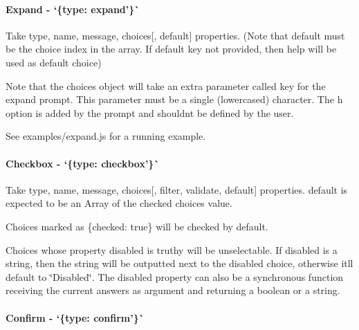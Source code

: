  



\paragraph*{Expand -\/ `\{type\+: \textquotesingle{}expand'\}\`{}}

Take {\ttfamily type}, {\ttfamily name}, {\ttfamily message}, {\ttfamily choices}\mbox{[}, {\ttfamily default}\mbox{]} properties. (Note that default must be the choice {\ttfamily index} in the array. If {\ttfamily default} key not provided, then {\ttfamily help} will be used as default choice)

Note that the {\ttfamily choices} object will take an extra parameter called {\ttfamily key} for the {\ttfamily expand} prompt. This parameter must be a single (lowercased) character. The {\ttfamily h} option is added by the prompt and shouldn\textquotesingle{}t be defined by the user.

See {\ttfamily examples/expand.\+js} for a running example.

  



\paragraph*{Checkbox -\/ `\{type\+: \textquotesingle{}checkbox'\}\`{}}

Take {\ttfamily type}, {\ttfamily name}, {\ttfamily message}, {\ttfamily choices}\mbox{[}, {\ttfamily filter}, {\ttfamily validate}, {\ttfamily default}\mbox{]} properties. {\ttfamily default} is expected to be an Array of the checked choices value.

Choices marked as {\ttfamily \{checked\+: true\}} will be checked by default.

Choices whose property {\ttfamily disabled} is truthy will be unselectable. If {\ttfamily disabled} is a string, then the string will be outputted next to the disabled choice, otherwise it\textquotesingle{}ll default to {\ttfamily \char`\"{}\+Disabled\char`\"{}}. The {\ttfamily disabled} property can also be a synchronous function receiving the current answers as argument and returning a boolean or a string.

 



\paragraph*{Confirm -\/ `\{type\+: \textquotesingle{}confirm'\}\`{}}

